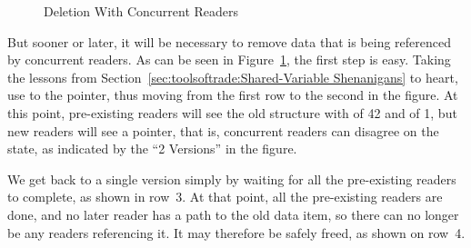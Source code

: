 \begin{figure}[tb]
\centering
{}
\caption{Deletion With Concurrent Readers}
\label{fig:defer:Deletion With Concurrent Readers}
\end{figure}

But sooner or later, it will be necessary to remove data that is
being referenced by concurrent readers.
As can be seen in
Figure~\ref{fig:defer:Deletion With Concurrent Readers},
the first step is easy.
Taking the lessons from
Section~\ref{sec:toolsoftrade:Shared-Variable Shenanigans}
to heart, use  to  the pointer,
thus moving from the first row to the second in the figure.
At this point, pre-existing readers will see the old structure with
 of 42 and  of 1, but new readers will see
a  pointer, that is, concurrent readers can disagree on
the state, as indicated by the ``2 Versions'' in the figure.

We get back to a single version simply by waiting for all the
pre-existing readers to complete, as shown in row~3.
At that point, all the pre-existing readers are done, and no later
reader has a path to the old data item, so there can no longer be
any readers referencing it.
It may therefore be safely freed, as shown on row~4.

